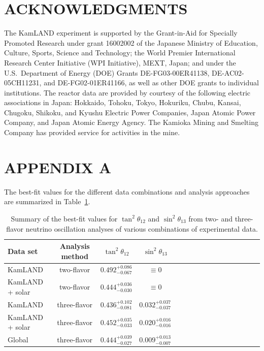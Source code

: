 \documentclass[aps,prc,twocolumn,groupedaddress,showpacs,amsmath,amssymb,floatfix,superscriptaddress]{revtex4}
\begin{document}
\section*{ACKNOWLEDGMENTS}

The KamLAND experiment is supported by the Grant-in-Aid for 
Specially Promoted Research under grant 16002002
of the Japanese Ministry of Education, Culture, Sports, Science and Technology;
the World Premier International Research Center Initiative (WPI Initiative), MEXT, Japan;
and under the U.S.\ Department of Energy (DOE) Grants DE-FG03-00ER41138, DE-AC02-05CH11231, and DE-FG02-01ER41166,
as well as other DOE grants to individual institutions.
The reactor data are provided by courtesy of the following electric associations in Japan: Hokkaido, Tohoku, Tokyo, Hokuriku, Chubu, Kansai, Chugoku, Shikoku, and Kyushu Electric Power Companies, Japan Atomic Power Company, and Japan Atomic Energy Agency. 
The Kamioka Mining and Smelting Company has provided service for activities in the mine.


\vspace{1.0cm}
\section*{APPENDIX A}
The best-fit values for the different data combinations and analysis approaches are summarized in Table~\ref{table:fit-values}.
\hspace{0.5cm}
\begin{center}
\begin{table}[h]
\caption{\label{table:fit-values}
Summary of the best-fit values for $\tan^{2} \theta_{12}$ and $\sin^{2} \theta_{13}$ from two- and three-flavor neutrino oscillation analyses of various combinations of experimental data.  
}
\centering
\begin{tabular}{@{}*{4}{lccc}}
\hline
\hline
\hspace{0.3cm} Data set & Analysis method & \hspace{0.3cm} $\tan^{2} \theta_{12}$ \hspace{0.3cm} & \hspace{0.3cm} $\sin^{2} \theta_{13}$ \hspace{0.3cm} \\
\hline
KamLAND & two-flavor & $0.492^{+0.086}_{-0.067}$ & $\equiv 0$ \\
KamLAND + solar & two-flavor & $0.444^{+0.036}_{-0.030}$ & $\equiv 0$ \\
KamLAND & three-flavor & $0.436^{+0.102}_{-0.081}$ & $0.032^{+0.037}_{-0.037}$ \\
KamLAND + solar & three-flavor & $0.452^{+0.035}_{-0.033}$ & $0.020^{+0.016}_{-0.016}$ \\
Global & three-flavor & $0.444^{+0.039}_{-0.027}$ & $0.009^{+0.013}_{-0.007}$ \\
\hline
\hline
\end{tabular}
\end{table}
\vspace{-1.0cm}
\end{center}
\hspace{3.0cm}
\end{document}
